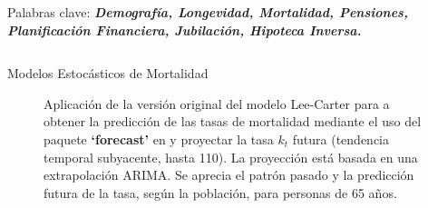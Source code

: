 \documentclass[]{beamer}
\begin{document}
\begin{frame}{\vspace{1ex}\hfill Palabras clave: \bfseries \textit{Demograf\'ia, Longevidad, Mortalidad, Pensiones, Planificaci\'on Financiera, Jubilaci\'on, Hipoteca Inversa.}}
\begin{columns}[t]
\begin{block}{Modelos Estoc\'asticos de Mortalidad}
			\vspace{-0.6cm}
			\begin{figure}[h]
				\centering
					\caption{\small  Aplicaci\'on de la versi\'on original del modelo Lee-Carter para a obtener la predicci\'on de las tasas de mortalidad mediante el uso del paquete \textbf{`forecast'} en  y proyectar la tasa $k_{t}$ futura (tendencia temporal subyacente, hasta 110). La proyecci\'on est\'a basada en una extrapolaci\'on ARIMA. Se aprecia el patr\'on pasado y la predicci\'on futura de la tasa, seg\'un la poblaci\'on, para personas de 65 a\~nos.}
					\label{modelos}
			\end{figure}
\vspace{-0.2cm} %
		\end{block}


\end{columns}
\end{frame}
\end{document}
